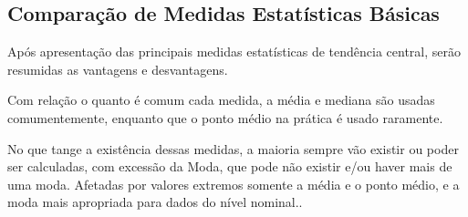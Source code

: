 





\subsection{Comparação de Medidas Estatísticas Básicas}

Após apresentação das principais medidas estatísticas de tendência central, serão resumidas as vantagens e desvantagens.\vskip0.3cm

Com relação o quanto é comum cada medida, a média e mediana são usadas comumentemente, enquanto que o ponto médio na prática é usado raramente.\vskip0.3cm


No que tange a existência dessas medidas, a maioria sempre vão existir ou poder ser calculadas, com excessão da Moda, que pode não existir e/ou haver mais de uma moda. Afetadas por valores extremos somente a média e o ponto médio, e a moda mais apropriada para dados do nível nominal..


